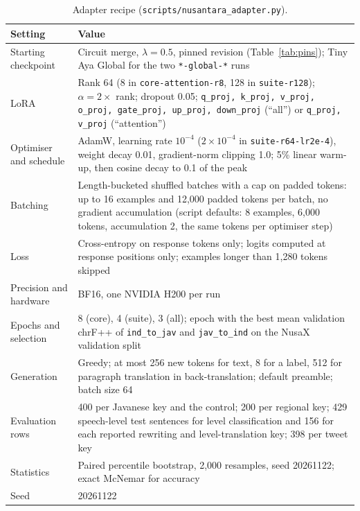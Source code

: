 \documentclass[11pt]{article}
\newcommand{\run}[1]{\texttt{#1}}
\begin{document}
\begin{table}[t]
\centering\footnotesize
\begin{tabular}{@{}L{3.3cm}L{12.2cm}@{}}
\toprule
Setting & Value \\
\midrule
Starting checkpoint & Circuit merge, $\lambda = 0.5$, pinned revision (Table~\ref{tab:pins}); Tiny Aya Global for the
two \run{*-global-*} runs \\
LoRA & Rank 64 (8 in \run{core-attention-r8}, 128 in \run{suite-r128}); $\alpha = 2 \times$ rank; dropout 0.05;
\texttt{q\_proj, k\_proj, v\_proj, o\_proj, gate\_proj, up\_proj, down\_proj} (``all'') or \texttt{q\_proj, v\_proj}
(``attention'') \\
Optimiser and schedule & AdamW, learning rate $10^{-4}$ ($2 \times 10^{-4}$ in \run{suite-r64-lr2e-4}), weight decay
0.01, gradient-norm clipping 1.0; 5\% linear warm-up, then cosine decay to 0.1 of the peak \\
Batching & Length-bucketed shuffled batches with a cap on padded tokens: up to 16 examples and 12,000 padded
tokens per batch, no gradient accumulation (script defaults: 8 examples, 6,000 tokens, accumulation 2, the same
tokens per optimiser step) \\
Loss & Cross-entropy on response tokens only; logits computed at response positions only; examples longer than
1,280 tokens skipped \\
Precision and hardware & BF16, one NVIDIA H200 per run \\
Epochs and selection & 8 (core), 4 (suite), 3 (all); epoch with the best mean validation chrF++ of
\texttt{ind\_to\_jav} and \texttt{jav\_to\_ind} on the NusaX validation split \\
Generation & Greedy; at most 256 new tokens for text, 8 for a label, 512 for paragraph translation in
back-translation; default preamble; batch size 64 \\
Evaluation rows & 400 per Javanese key and the control; 200 per regional key; 429 speech-level test sentences for
level classification and 156 for each reported rewriting and level-translation key; 398 per tweet key \\
Statistics & Paired percentile bootstrap, 2,000 resamples, seed 20261122; exact McNemar for accuracy \\
Seed & 20261122 \\
\bottomrule
\end{tabular}
\caption{Adapter recipe (\texttt{scripts/nusantara\_adapter.py}).}
\label{tab:hparams-adapter}
\end{table}
\end{document}
